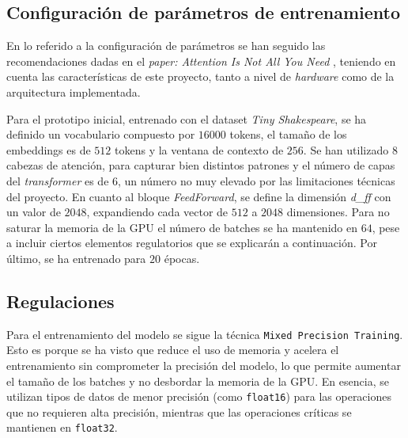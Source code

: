 \documentclass[11pt]{book}
\theoremstyle{plain}
\theoremstyle{definition}
\begin{document}
\subsection{Configuración de parámetros de entrenamiento}

En lo referido a la configuración de parámetros se han seguido las recomendaciones dadas en el \textit{paper: Attention Is Not All You Need} \parencite{gerber2025ffn}, teniendo en cuenta las características de este proyecto, tanto a nivel de  \textit{hardware} como de la arquitectura implementada.

Para el prototipo inicial, entrenado con el dataset \textit{Tiny Shakespeare}, se ha definido un vocabulario compuesto por $16000$ tokens, el tamaño de los embeddings es de $512$ tokens y la ventana de contexto de $256$. Se han utilizado $8$ cabezas de atención, para capturar bien distintos patrones y el número de capas del \textit{transformer} es de $6$, un número no muy elevado por las limitaciones técnicas del proyecto. En cuanto al bloque \textit{FeedForward}, se define la dimensión \textit{d\_ff} con un valor de $2048$, expandiendo cada vector de $512$ a $2048$ dimensiones. Para no saturar la memoria de la GPU el número de batches se ha mantenido en $64$, pese a incluir ciertos elementos regulatorios que se explicarán a continuación. Por último, se ha entrenado para $20$ épocas.


\subsection{Regulaciones}

Para el entrenamiento del modelo se sigue la técnica \texttt{Mixed Precision Training}. Esto es porque se ha visto que reduce el uso de memoria y acelera el entrenamiento sin comprometer la precisión del modelo, lo que permite aumentar el tamaño de los batches y no desbordar la memoria de la GPU. En esencia, se utilizan tipos de datos de menor precisión (como \texttt{float16}) para las operaciones que no requieren alta precisión, mientras que las operaciones críticas se mantienen en \texttt{float32}. 
\end{document}

